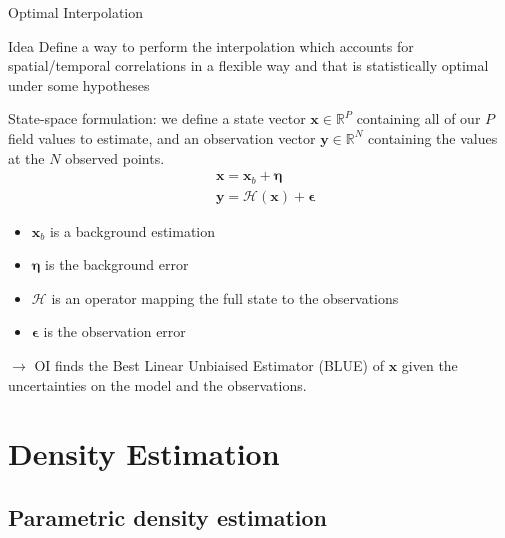 \documentclass{beamer}
\begin{document}
\begin{frame}{Optimal Interpolation}

\begin{block}{Idea}
Define a way to perform the interpolation which accounts for spatial/temporal correlations in a flexible way and that is statistically optimal under some hypotheses
\end{block}

State-space formulation: we define a state vector $\mathbf{x} \in \mathbb{R}^{P}$ containing all of our $P$ field values to estimate, and an observation vector $\mathbf{y} \in \mathbb{R}^{N}$ containing the values at the $N$ observed points.
\begin{align*}
&\mathbf{x} = \mathbf{x}_{b} + \boldsymbol{\eta} \\
&\mathbf{y} = \mathcal{H}(\mathbf{x}) +\boldsymbol{\epsilon}
\end{align*}

\begin{itemize}
\item $\mathbf{x}_{b}$ is a background estimation
\item $\boldsymbol{\eta}$ is the background error
\item $\mathcal{H}$ is an operator mapping the full state to the observations
\item $\boldsymbol{\epsilon}$ is the observation error
\end{itemize}

$\rightarrow$ OI finds the Best Linear Unbiaised Estimator (BLUE) of $\mathbf{x}$ given the uncertainties on the model and the observations.

\end{frame}

\section{Density Estimation}
\subsection{Parametric density estimation}
\end{document}
